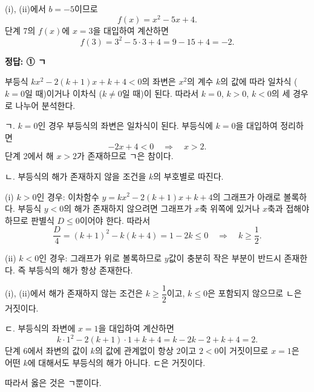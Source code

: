 \documentclass[10pt]{article}
\begin{document}
 (i), (ii)에서 $b = -5$이므로
\[ f(x) = x^2 - 5x + 4. \]
 단계 7의 $f(x)$에 $x = 3$을 대입하여 계산하면
\[ f(3) = 3^2 - 5 \cdot 3 + 4 = 9 - 15 + 4 = -2. \]

\begin{answerbox}\sffamily\bfseries 정답: ① ㄱ\end{answerbox}
 부등식 $kx^2 - 2(k+1)x + k + 4 < 0$의 좌변은 $x^2$의 계수 $k$의 값에 따라 일차식 ($k = 0$일 때)이거나 이차식 ($k \ne 0$일 때)이 된다. 따라서 $k = 0$, $k > 0$, $k < 0$의 세 경우로 나누어 분석한다.

 ㄱ. $k = 0$인 경우 부등식의 좌변은 일차식이 된다. 부등식에 $k = 0$을 대입하여 정리하면
\[ -2x + 4 < 0 \quad \Longrightarrow \quad x > 2. \]
 단계 2에서 해 $x > 2$가 존재하므로 ㄱ은 참이다.

 ㄴ. 부등식의 해가 존재하지 않을 조건을 $k$의 부호별로 따진다.

(i) $k > 0$인 경우: 이차함수 $y = kx^2 - 2(k+1)x + k + 4$의 그래프가 아래로 볼록하다. 부등식 $y < 0$의 해가 존재하지 않으려면 그래프가 $x$축 위쪽에 있거나 $x$축과 접해야 하므로 판별식 $D \le 0$이어야 한다. 따라서
\[ \frac{D}{4} = (k + 1)^2 - k(k + 4) = 1 - 2k \le 0 \quad \Longrightarrow \quad k \ge \dfrac{1}{2}. \]

(ii) $k < 0$인 경우: 그래프가 위로 볼록하므로 $y$값이 충분히 작은 부분이 반드시 존재한다. 즉 부등식의 해가 항상 존재한다.

 (i), (ii)에서 해가 존재하지 않는 조건은 $k \ge \dfrac{1}{2}$이고, $k \le 0$은 포함되지 않으므로 ㄴ은 거짓이다.

 ㄷ. 부등식의 좌변에 $x = 1$을 대입하여 계산하면
\[ k \cdot 1^2 - 2(k + 1) \cdot 1 + k + 4 = k - 2k - 2 + k + 4 = 2. \]
 단계 6에서 좌변의 값이 $k$의 값에 관계없이 항상 $2$이고 $2 < 0$이 거짓이므로 $x = 1$은 어떤 $k$에 대해서도 부등식의 해가 아니다. ㄷ은 거짓이다.

 따라서 옳은 것은 ㄱ뿐이다.
\end{document}
